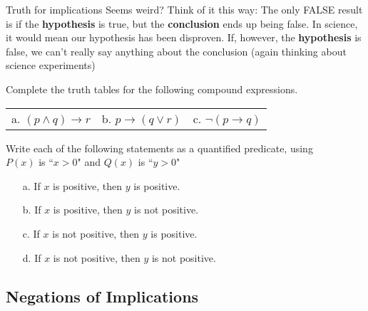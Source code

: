 {\begin{intro}{Truth for implications}
            Seems weird? Think of it this way: The only FALSE result is if
            the \textbf{hypothesis} is true, but the \textbf{conclusion}
            ends up being false. In science, it would mean our hypothesis
            has been disproven. If, however, the \textbf{hypothesis}
            is false, we can't really say anything about the conclusion
            (again thinking about science experiments)
        \end{intro}

    \begin{questionNOGRADE}{\thequestion}
        Complete the truth tables for the following
        compound expressions.

        \begin{center}
            \begin{tabular}{p{4cm} p{4cm} p{4cm}}
                a. $(p \land q) \to r$ &
                b. $p \to (q \lor r)$ &
                c. $\neg( p \to q )$
            \end{tabular}
        \end{center}        
    \end{questionNOGRADE}

    \hrulefill

    \begin{questionNOGRADE}{\thequestion}
        Write each of the following statements as a
        quantified predicate, using \\
        $P(x)$ is ``$x > 0$" and
        $Q(x)$ is ``$y > 0$"

        \begin{enumerate}
            \item[a.] If $x$ is positive, then $y$ is positive. 
            \item[b.] If $x$ is positive, then $y$ is not positive. 
            \item[c.] If $x$ is not positive, then $y$ is positive. 
            \item[d.] If $x$ is not positive, then $y$ is not positive.
        \end{enumerate}        
    \end{questionNOGRADE}

    \newpage

    \subsection{Negations of Implications}

}
